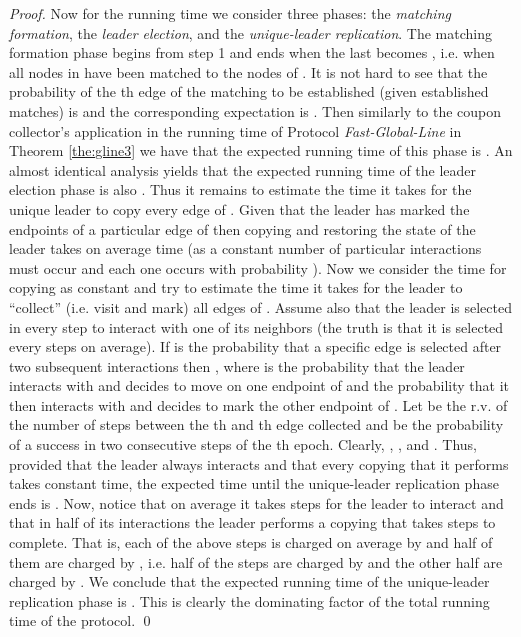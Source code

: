 \documentclass[oribibl, 11pt]{llncs}
\begin{document}
\begin{proof}
Now for the running time we consider three phases: the \emph{matching formation}, the \emph{leader election}, and the \emph{unique-leader replication}. The matching formation phase begins from step 1 and ends when the last  becomes , i.e. when all nodes in  have been matched to the nodes of . It is not hard to see that the probability of the th edge of the matching to be established (given  established matches) is  and the corresponding expectation is . Then similarly to the coupon collector's application in the running time of Protocol \emph{Fast-Global-Line} in Theorem \ref{the:gline3} we have that the expected running time of this phase is . An almost identical analysis yields that the expected running time of the leader election phase is also . Thus it remains to estimate the time it takes for the unique leader to copy every edge of . Given that the leader has marked the endpoints of a particular edge of  then copying and restoring the state of the leader takes on average  time (as a constant number of particular interactions must occur and each one occurs with probability ). Now we consider the time for copying as constant and try to estimate the time it takes for the leader to ``collect'' (i.e. visit and mark) all edges of . Assume also that the leader is selected in every step to interact with one of its neighbors (the truth is that it is selected every  steps on average). If  is the probability that a specific edge  is selected after two subsequent interactions then , where  is the probability that the leader interacts with and decides to move on one endpoint of  and  the probability that it then interacts with and decides to mark the other endpoint of . Let  be the r.v. of the number of steps between the th and th edge collected and  be the probability of a success in two consecutive steps of the th epoch. Clearly, , , and . Thus, provided that the leader always interacts and that every copying that it performs takes constant time, the expected time until the unique-leader replication phase ends is . Now, notice that on average it takes  steps for the leader to interact and that in half of its interactions the leader performs a copying that takes  steps to complete. That is, each of the above  steps is charged on average by  and half of them are charged by , i.e. half of the steps are charged by  and the other half are charged by . We conclude that the expected running time of the unique-leader replication phase is . This is clearly the dominating factor of the total running time of the protocol.
\qed
\end{proof}
\end{document}
